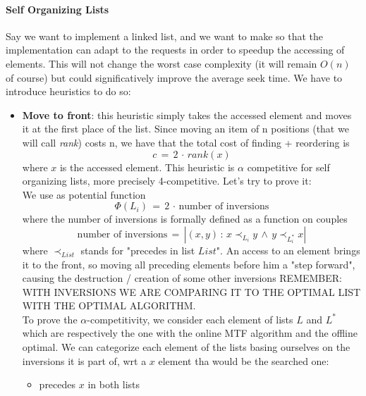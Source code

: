 \documentclass{article}
\begin{document}
		\paragraph{Self Organizing Lists}
			Say we want to implement a linked list, and we want to make so that the implementation can adapt to the requests in order to speedup the accessing of elements. This will not change the worst case complexity (it will remain $O(n)$ of course) but could significatively improve the average seek time. We have to introduce heuristics to do so:
			\begin{itemize}
				\item \textbf{Move to front}: this heuristic simply takes the accessed element and moves it at the first place of the list. Since moving an item of n positions (that we will call \textit{rank}) costs n, we have that the total cost of finding + reordering is
					\begin{equation}
						c \,=\, 2 \,\cdot\, rank(x)
					\end{equation}
					where $x$ is the accessed element. This heuristic is $\alpha$ competitive for self organizing lists, more precisely 4-competitive. Let's try to prove it:\\
					We use as potential function
					\begin{equation}
						\Phi(L_i) \,=\, 2 \,\cdot\, \text{number of inversions}
					\end{equation}
					where the number of inversions is formally defined as a function on couples
					\begin{equation}
						\text{number of inversions} \,=\, |(x, y) \,:\, x \prec_{L_i} y \,\wedge\, y \prec_{L_i^*} x |
					\end{equation}
					where $\prec_{List}$ stands for "precedes in list $List$". An access to an element brings it to the front, so moving all preceding elements before him a "step forward", causing the destruction / creation of some other inversions REMEMBER: WITH INVERSIONS WE ARE COMPARING IT TO THE OPTIMAL LIST WITH THE OPTIMAL ALGORITHM.\\
					To prove the $\alpha$-competitivity, we consider each element of lists $L$ and $L^*$ which are respectively the one with the online MTF algorithm and the offline optimal. We can categorize each element of the lists basing ourselves on the inversions it is part of, wrt a $x$ element tha would be the searched one:
					\begin{itemize}
						\item precedes $x$ in both lists

\end{itemize}
\end{itemize}
\end{document}
